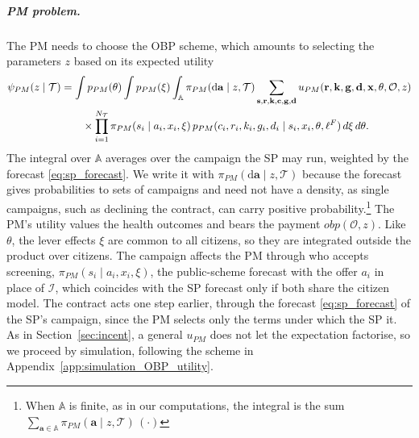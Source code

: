 \documentclass[12pt]{article}
\begin{document}
\subparagraph{PM problem.}
The PM needs to choose the OBP scheme, which amounts to selecting the parameters $z$ based on its expected utility
\begin{align}\label{eq:pm_util}
    \psi_{PM}(z \mid \mathcal{T}) &= \int p_{PM}(\theta) \int p_{PM}(\xi) \int_{\mathbb{A}} \pi_{PM}(\mathrm{d}\mathbf{a} \mid z, \mathcal{T}) \sum_{\mathbf{s}, \mathbf{r}, \mathbf{k}, \mathbf{c}, \mathbf{g}, \mathbf{d}}
     u_{PM}( \mathbf{r}, \mathbf{k}, \mathbf{g}, \mathbf{d}, \mathbf{x}, \theta, \mathcal{O}, z) \notag \\
    & \qquad \times \prod_{i=1}^{N_{\mathcal{T}}} \pi_{PM}(s_i \mid a_i, x_i, \xi)\, p_{PM}(c_i, r_i, k_i, g_i, d_i \mid s_i, x_i, \theta, \ell^F)\, d\xi\, d\theta.
\end{align}
The integral over $\mathbb{A}$ averages over the campaign the SP may run, weighted by the forecast \eqref{eq:sp_forecast}. We write it with $\pi_{PM}(\mathrm{d}\mathbf{a} \mid z, \mathcal{T})$ because the forecast gives probabilities to sets of campaigns and need not have a density, as single campaigns, such as declining the contract, can carry positive probability.\footnote{When $\mathbb{A}$ is finite, as in our computations, the integral is the sum $\sum_{\mathbf{a} \in \mathbb{A}} \pi_{PM}(\mathbf{a} \mid z, \mathcal{T})\,(\cdot)$} The PM's utility values the health outcomes and bears the payment $obp(\mathcal{O}, z)$. Like $\theta$, the lever effects $\xi$ are common to all citizens, so they are integrated outside the product over citizens. The campaign affects the PM through who accepts screening, $\pi_{PM}(s_i \mid a_i, x_i, \xi)$, the public-scheme forecast with the offer $a_i$ in place of $\mathcal{I}$, which coincides with the SP forecast only if both share the citizen model. The contract acts one step earlier, through the forecast \eqref{eq:sp_forecast} of the SP's campaign, since the PM selects only the terms under which the SP it. As in Section~\ref{sec:incent}, a general $u_{PM}$ does not let the expectation factorise, so we proceed by simulation, following the scheme in Appendix~\ref{app:simulation_OBP_utility}.


\end{document}
